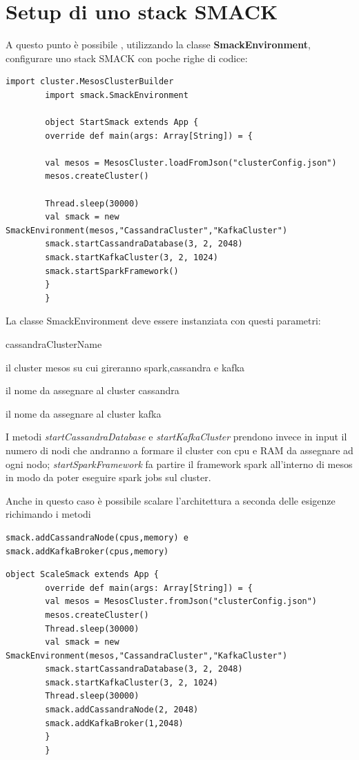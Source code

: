 \documentclass[12pt,a4paper]{article}
\begin{document}
    \section{Setup di uno stack SMACK}\label{sec:setupSmack}
    A questo punto \`e possibile , utilizzando la classe \textbf{SmackEnvironment}, configurare uno stack SMACK con poche righe di codice:

    \begin{lstlisting}[style=myScalastyle]
        import cluster.MesosClusterBuilder
        import smack.SmackEnvironment

        object StartSmack extends App {
        override def main(args: Array[String]) = {

        val mesos = MesosCluster.loadFromJson("clusterConfig.json")
        mesos.createCluster()

        Thread.sleep(30000)
        val smack = new SmackEnvironment(mesos,"CassandraCluster","KafkaCluster")
        smack.startCassandraDatabase(3, 2, 2048)
        smack.startKafkaCluster(3, 2, 1024)
        smack.startSparkFramework()
        }
        }
    \end{lstlisting}
    La classe SmackEnvironment deve essere instanziata con questi parametri:
    \begin{labeling}{cassandraClusterName}
        \item[mesos]
        il cluster mesos su cui gireranno spark,cassandra e kafka
        \item [cassandraClusterName]
        il nome da assegnare al cluster cassandra
        \item [kafkaClusterName]
        il nome da assegnare al cluster kafka
    \end{labeling}

    I metodi \textit{startCassandraDatabase} e \textit{startKafkaCluster} prendono invece in input il numero di nodi che andranno a formare il cluster con cpu e RAM da assegnare ad ogni nodo;
    \textit{startSparkFramework} fa partire il framework spark all'interno di mesos in modo da poter eseguire spark jobs sul cluster.

    Anche in questo caso è possibile scalare l'architettura a seconda delle esigenze richimando i metodi
    \begin{lstlisting}[style=myScalastyle]
        smack.addCassandraNode(cpus,memory) e smack.addKafkaBroker(cpus,memory)
    \end{lstlisting}
    \begin{lstlisting}[style=myScalastyle]
        object ScaleSmack extends App {
        override def main(args: Array[String]) = {
        val mesos = MesosCluster.fromJson("clusterConfig.json")
        mesos.createCluster()
        Thread.sleep(30000)
        val smack = new SmackEnvironment(mesos,"CassandraCluster","KafkaCluster")
        smack.startCassandraDatabase(3, 2, 2048)
        smack.startKafkaCluster(3, 2, 1024)
        Thread.sleep(30000)
        smack.addCassandraNode(2, 2048)
        smack.addKafkaBroker(1,2048)
        }
        }
    \end{lstlisting}
\end{document}
